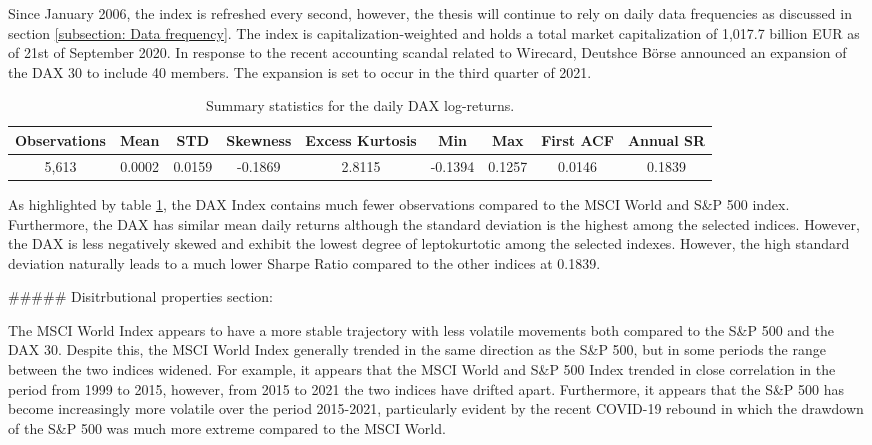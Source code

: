 Since January 2006, the index is refreshed every second, however, the thesis will continue to rely on daily data frequencies as discussed in section \ref{subsection: Data frequency}. The index is capitalization-weighted and holds a total market capitalization of 1,017.7 billion EUR as of 21st of September 2020. In response to the recent accounting scandal related to Wirecard, Deutshce Börse announced an expansion of the DAX 30 to include 40 members. The expansion is set to occur in the third quarter of 2021.

\begin{table}[H]
\caption{Summary statistics for the daily DAX log-returns.}
\centering
\begin{tabular}{c c c c c c c c c} 
\hline\hline
Observations & Mean & STD & Skewness & Excess Kurtosis & Min & Max & First ACF & Annual SR \\
\hline
5,613 & 0.0002 & 0.0159 & -0.1869 & 2.8115 & -0.1394 & 0.1257 & 0.0146 & 0.1839 \\
\hline
\end{tabular}
\label{tab:summary_stats_DAX}
\end{table}

As highlighted by table \ref{tab:summary_stats_DAX}, the DAX Index contains much fewer observations compared to the MSCI World and S\&P 500 index. Furthermore, the DAX has similar mean daily returns although the standard deviation is the highest among the selected indices. However, the DAX is less negatively skewed and exhibit the lowest degree of leptokurtotic among the selected indexes. However, the high standard deviation naturally leads to a much lower Sharpe Ratio compared to the other indices at 0.1839.


##### Disitrbutional properties section:

The MSCI World Index appears to have a more stable trajectory with less volatile movements both compared to the S\&P 500 and the DAX 30. Despite this, the MSCI World Index generally trended in the same direction as the S\&P 500,
but in some periods the range between the two indices widened. For example,
it appears that the MSCI World and S\&P 500 Index trended in close correlation in the period from 1999 to 2015, however, from 2015 to 2021 the two indices have drifted apart. Furthermore, it appears that the S\&P 500 has become increasingly more volatile over the period 2015-2021, particularly evident by the recent COVID-19 rebound in which the drawdown of the S\&P 500 was much more extreme compared to the MSCI World.  

